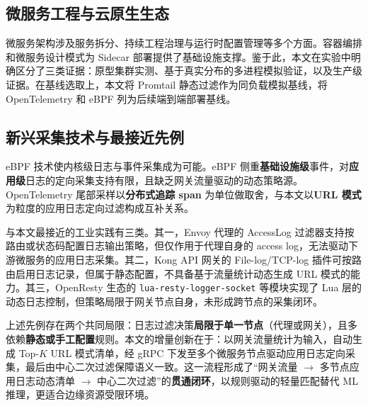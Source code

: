 \subsection{微服务工程与云原生生态}
微服务架构涉及服务拆分、持续工程治理与运行时配置管理等多个方面\cite{ding2020decomposition,jia2021loggingdecision,jamshidi2018microservices,seshagiri2022sok}。容器编排和微服务设计模式为 Sidecar 部署提供了基础设施支撑\cite{burns2016patterns,burns2016borg,richardson2018microservices}。鉴于此，本文在实验中明确区分了三类证据：原型集群实测、基于真实分布的多进程模拟验证，以及生产级证据。在基线选取上，本文将 Promtail 静态过滤作为同负载模拟基线，将 OpenTelemetry 和 eBPF 列为后续端到端部署基线。

\subsection{新兴采集技术与最接近先例}
eBPF 技术使内核级日志与事件采集成为可能\cite{soldani2023ebpf,yang2023nahida}。eBPF 侧重\textbf{基础设施级}事件，对\textbf{应用级}日志的定向采集支持有限，且缺乏网关流量驱动的动态策略源。OpenTelemetry 尾部采样以\textbf{分布式追踪 span} 为单位做取舍，与本文以\textbf{URL 模式}为粒度的应用日志定向过滤构成互补关系。

与本文最接近的工业实践有三类。其一，Envoy 代理的 AccessLog 过滤器支持按路由或状态码配置日志输出策略，但仅作用于代理自身的 access log，无法驱动下游微服务的应用日志采集。其二，Kong API 网关的 File-log/TCP-log 插件可按路由启用日志记录，但属于静态配置，不具备基于流量统计动态生成 URL 模式的能力。其三，OpenResty 生态的 \texttt{lua-resty-logger-socket} 等模块实现了 Lua 层的动态日志控制，但策略局限于网关节点自身，未形成跨节点的采集闭环。

上述先例存在两个共同局限：日志过滤决策\textbf{局限于单一节点}（代理或网关），且多依赖\textbf{静态或手工配置}规则。本文的增量创新在于：以网关流量统计为输入，自动生成 Top-$K$ URL 模式清单，经 gRPC 下发至多个微服务节点驱动应用日志定向采集，最后由中心二次过滤保障语义一致。这一流程形成了``网关流量 $\rightarrow$ 多节点应用日志动态清单 $\rightarrow$ 中心二次过滤''的\textbf{贯通闭环}，以规则驱动的轻量匹配替代 ML 推理，更适合边缘资源受限环境。

